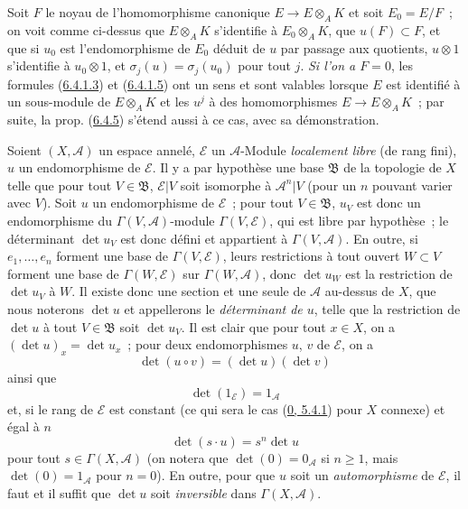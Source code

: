 \begin{remark}[6.4.7]
Soit $F$ le noyau de l'homomorphisme canonique $E\to E\otimes_AK$ et soit
$E_0=E/F$~; on voit comme ci-dessus que $E\otimes_AK$ s'identifie à
$E_0\otimes_AK$, que $u(F)\subset F$, et que si $u_0$ est l'endomorphisme de
$E_0$ déduit de $u$ par passage aux quotients, $u\otimes1$ s'identifie à
$u_0\otimes1$, et $\sigma_j(u)=\sigma_j(u_0)$ pour tout $j$. \emph{Si l'on a
$F=0$}, les formules (\hyperref[II.6.4.1.3-fr]{6.4.1.3}) et
(\hyperref[II.6.4.1.5-fr]{6.4.1.5}) ont un sens et sont valables lorsque $E$
est identifié à un sous-module de $E\otimes_AK$ et les $u^j$ à des
homomorphismes $E\to E\otimes_AK$~; par suite, la prop.
(\hyperref[II.6.4.5-fr]{6.4.5}) s'étend aussi à ce cas, avec sa démonstration.
\end{remark}

\begin{env}[6.4.8]
\label{II.6.4.8-fr}
Soient $(X,\mathcal{A})$ un espace annelé, $\mathcal{E}$ un
$\mathcal{A}$-Module \emph{localement libre} (de rang fini), $u$ un
endomorphisme de $\mathcal{E}$. Il y a par hypothèse une base $\mathfrak{B}$
de la topologie de $X$ telle que pour tout $V\in\mathfrak{B}$,
$\mathcal{E}|V$ soit isomorphe à $\mathcal{A}^n|V$ (pour un $n$ pouvant varier
avec $V$). Soit $u$ un endomorphisme de $\mathcal{E}$~; pour tout
$V\in\mathfrak{B}$, $u_V$ est donc un endomorphisme du
$\Gamma(V,\mathcal{A})$-module $\Gamma(V,\mathcal{E})$, qui est libre par
hypothèse~; le déterminant $\det u_V$ est donc défini et appartient à
$\Gamma(V,\mathcal{A})$. En outre, si $e_1,\ldots,e_n$ forment une base de
$\Gamma(V,\mathcal{E})$, leurs restrictions à tout ouvert $W\subset V$
forment une base de $\Gamma(W,\mathcal{E})$ sur $\Gamma(W,\mathcal{A})$,
donc $\det u_W$ est la restriction de $\det u_V$ à $W$. Il existe donc une
section et une seule de $\mathcal{A}$ au-dessus de $X$, que nous noterons
$\det u$ et appellerons le \emph{déterminant de $u$}, telle que la restriction
de $\det u$ à tout $V\in\mathfrak{B}$ soit $\det u_V$. Il est clair que pour
tout $x\in X$, on a $(\det u)_x=\det u_x$~; pour deux endomorphismes $u$, $v$
de $\mathcal{E}$, on a
\[
\label{II.6.4.8.1-fr}
\det(u\circ v)=(\det u)(\det v)
\tag{6.4.8.1}
\]
ainsi que
\[
\label{II.6.4.8.2-fr}
\det(1_{\mathcal{E}})=1_{\mathcal{A}}
\tag{6.4.8.2}
\]
et, si le rang de $\mathcal{E}$ est constant (ce qui sera le cas
(\hyperref[0.5.4.1-fr]{0, 5.4.1}) pour $X$ connexe) et égal à $n$
\[
\label{II.6.4.8.3-fr}
\det(s\cdot u)=s^n\det u
\tag{6.4.8.3}
\]
pour tout $s\in\Gamma(X,\mathcal{A})$ (on notera que
$\det(0)=0_{\mathcal{A}}$ si $n\geq1$, mais $\det(0)=1_{\mathcal{A}}$ pour
$n=0$). En outre, pour que $u$ soit un \emph{automorphisme} de
$\mathcal{E}$, il faut et il suffit que $\det u$ soit \emph{inversible} dans
$\Gamma(X,\mathcal{A})$.


\end{env}
